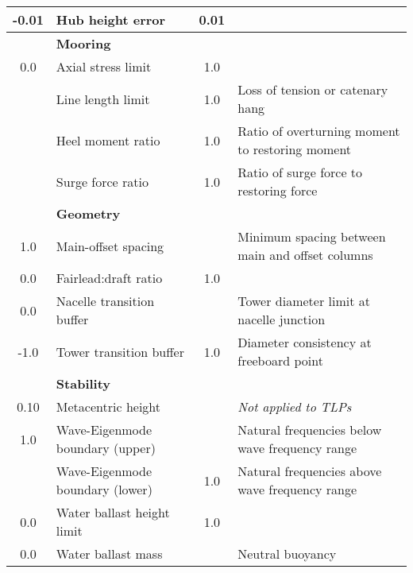 \begin{table}[htbp]
\begin{center}
{\begin{tabularx}{\textwidth}{ c l c X}
  -0.01 & Hub height error & 0.01 &\\
\hline & \textbf{Mooring} &  & \\
  0.0 & Axial stress limit & 1.0 &\\
 & Line length limit & 1.0 & Loss of tension or catenary hang\\
 & Heel moment ratio & 1.0 & Ratio of overturning moment to restoring moment\\
 & Surge force ratio & 1.0 & Ratio of surge force to restoring force\\
\hline & \textbf{Geometry} &  & \\
  1.0 & Main-offset spacing &  & Minimum spacing between main and offset columns \\
  0.0 & Fairlead:draft ratio & 1.0 &\\
  0.0 & Nacelle transition buffer &  & Tower diameter limit at nacelle junction\\
  -1.0 & Tower transition buffer & 1.0 & Diameter consistency at freeboard point\\
\hline & \textbf{Stability} &  & \\
  0.10 & Metacentric height &  & \textit{Not applied to TLPs}\\
  1.0 & Wave-Eigenmode boundary (upper) &  & Natural frequencies below wave frequency range\\
 & Wave-Eigenmode boundary (lower) & 1.0 & Natural frequencies above wave frequency range\\
  0.0 & Water ballast height limit & 1.0 & \\
  0.0 & Water ballast mass &  & Neutral buoyancy\\
    \hline \end{tabularx}
  }
\end{center} \end{table}
